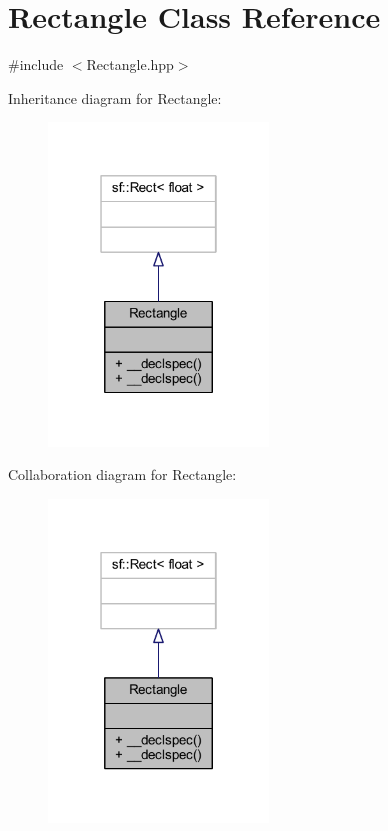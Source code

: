 \hypertarget{class_rectangle}{\section{Rectangle Class Reference}
\label{class_rectangle}
}


{\ttfamily \#include $<$Rectangle.\-hpp$>$}



Inheritance diagram for Rectangle\-:
\nopagebreak
\begin{figure}[H]
\begin{center}
\leavevmode
\includegraphics[width=166pt]{class_rectangle__inherit__graph}
\end{center}
\end{figure}


Collaboration diagram for Rectangle\-:
\nopagebreak
\begin{figure}[H]
\begin{center}
\leavevmode
\includegraphics[width=166pt]{class_rectangle__coll__graph}
\end{center}
\end{figure}
